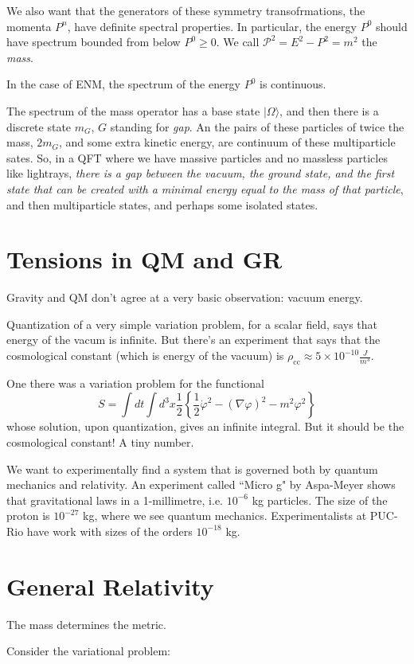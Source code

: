 We also want that the generators of these symmetry transofrmations, the momenta
$P^n$, have definite spectral properties. In particular, the energy $P^0$ should
have spectrum bounded from below $P^0\geq 0$. We call
$\mathcal{P}^2=E^2-P^2=m^2$ the {\it mass}.

In the case of ENM, the spectrum of the energy  $P^0$ is continuous.

The spectrum of the mass operator has a base state $|\Omega\rangle$, and then
there is a discrete state $m_G$, $G$ standing for \textit{gap}. An the pairs of
these particles of twice the mass, $2m_G$, and some extra kinetic energy, are
continuum of these multiparticle sates. So, in a QFT where we have massive
particles and no massless particles like lightrays, \textit{there is a gap
between the vacuum, the ground state, and the first state that can be created
with a minimal energy equal to the mass of that particle}, and then
multiparticle states, and perhaps some isolated states.

\section{Tensions in QM and GR}
\label{section-tensions}

Gravity and QM don't agree at a very basic observation: vacuum energy.

Quantization of a very simple variation problem, for a scalar field, says that
energy of the vacum is infinite. But there's an experiment that says that the
cosmological constant (which is energy of the vacuum) is
 $\rho_{\operatorname{cc}}\approx 5 \times 10^{-10}\frac{J}{m^3}$.

One there was a variation problem for the functional
$$
S=\int dt \int d^3x \frac{1}{2}\left\{ \frac{1}{2}\dot\varphi^2-(\nabla \varphi)^2-m^2\varphi^2\right\} 
$$
whose solution, upon quantization, gives an infinite integral. But it should be
the cosmological constant! A tiny number.

We want to experimentally find a system that is governed both by quantum
mechanics and relativity. An experiment called ``Micro g" by Aspa-Meyer shows
that gravitational laws in a 1-millimetre, i.e. $10^{-6}$ kg particles. The size
of the proton is $10^{-27}$ kg, where we see quantum mechanics. Experimentalists
at PUC-Rio have work with sizes of the orders $10^{-18}$ kg.

\section{General Relativity}
\label{section-general-relativity}
\begin{slogan}
The mass determines the metric.
\end{slogan}
Consider the variational problem:

